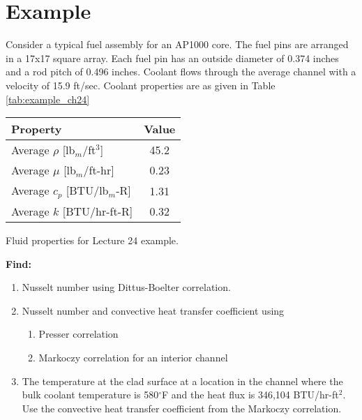\section{Example}
Consider a typical fuel assembly for an AP1000 core.  The fuel pins are arranged in a 17x17 square array.  Each fuel pin has an outside diameter of 0.374 inches and a rod pitch of 0.496 inches. Coolant flows through the average channel with a velocity of 15.9 ft/sec. Coolant properties are as given in Table \ref{tab:example_ch24}

\begin{margintable}
\begin{tabular}{l c}
\toprule
Property & Value \\
\hline
Average $\rho$ [lb$_m$/ft$^3$] & 45.2 \\
Average $\mu$ [lb$_m$/ft-hr] & 0.23 \\
Average $c_p$ [BTU/lb$_m$-R] & 1.31 \\
Average $k$ [BTU/hr-ft-R] & 0.32\\
\bottomrule
\end{tabular}
\caption{Fluid properties for Lecture 24 example.}
\label{tab:example_ch24}
\end{margintable}

\vspace{0.5 cm}
\textbf{Find:}
\begin{enumerate}
\item Nusselt number using Dittus-Boelter correlation.
\item Nusselt number and convective heat transfer coefficient using
\begin{enumerate}
\item Presser correlation
\item Markoczy correlation for an interior channel
\end{enumerate}
\item The temperature at the clad surface at a location in the channel where the bulk coolant temperature is 580$^{\circ}$F and the heat flux is 346,104 BTU/hr-ft$^{2}$.  Use the convective heat transfer coefficient from the Markoczy correlation.
\end{enumerate}


